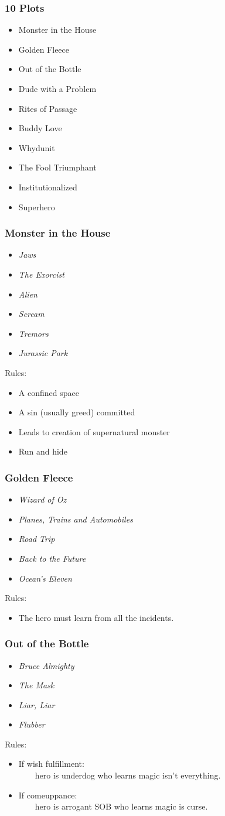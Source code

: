 \documentclass{beamer}
\newcommand{\bi}{\begin{itemize}}
\newcommand{\ei}{\end{itemize}}
\begin{document}
\begin{frame}\frametitle{10 Plots}
\bi
\item Monster in the House
\item Golden Fleece
\item Out of the Bottle
\item Dude with a Problem
\item Rites of Passage
\item Buddy Love
\item Whydunit
\item The Fool Triumphant
\item Institutionalized
\item Superhero
\ei

\end{frame}
\begin{frame}\frametitle{Monster in the House}
\bi
\item {\sl Jaws}
\item {\sl The Exorcist}
\item {\sl Alien}
\item {\sl Scream}
\item {\sl Tremors}
\item {\sl Jurassic Park}
\ei
Rules:
\bi
\item A confined space
\item A sin (usually greed) committed
\item Leads to creation of supernatural monster
\item Run and hide
\ei

\end{frame}
\begin{frame}\frametitle{Golden Fleece}
\bi
\item {\sl Wizard of Oz}
\item {\sl Planes, Trains and Automobiles}
\item {\sl Road Trip}
\item {\sl Back to the Future}
\item {\sl Ocean's Eleven}
\ei
Rules:
\bi
\item The hero must learn from all the incidents.
\ei


\end{frame}
\begin{frame}\frametitle{Out of the Bottle}
\bi
\item {\sl Bruce Almighty}
\item {\sl The Mask}
\item {\sl Liar, Liar}
\item {\sl Flubber}
\ei
Rules:
{\small
\bi
\item If wish fulfillment: \\
\ \ \ \ hero is underdog who learns magic isn't everything.
\item If comeuppance: \\
\ \ \ \ hero is arrogant SOB who learns magic is curse.
\ei
}

\end{frame}
\end{document}
